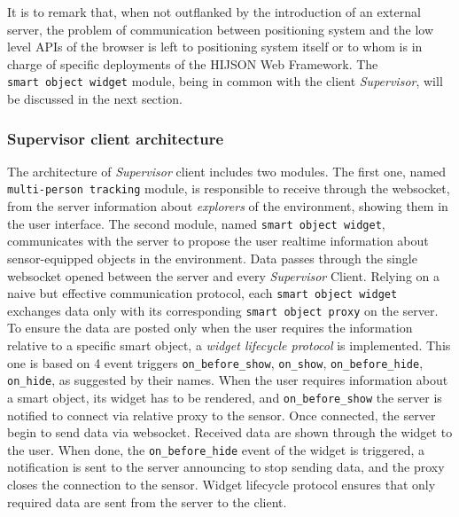 It is to remark that, when not outflanked by the introduction of an external
server, the problem of communication between positioning system and the low
level APIs of the browser is left to positioning system itself or to whom is
in charge of specific deployments of the HIJSON Web Framework.
The \texttt{smart\ object\ widget} module, being in common with the
client \emph{Supervisor}, will be discussed in the next section.

\subsubsection{Supervisor client architecture}\label{supervisor-client-architecture}

The architecture of \emph{Supervisor} client includes two modules. The first
one, named {\tt multi-person\ tracking} module, is responsible to
receive through the websocket, from the server information about
\emph{explorers} of the environment, showing them in the user interface. The
second module, named {\tt smart\ object\ widget}, communicates with the
server to propose the user realtime information about sensor-equip\-ped
objects in the environment. Data passes through the single websocket
opened between the server and every \emph{Supervisor} Client. Relying on a
naive but effective communication protocol, each {\tt smart object widget}
exchanges data only with its corresponding {\tt smart object proxy} on the server. To
ensure the data are posted only when the user requires the information
relative to a specific smart object, a \emph{widget lifecycle protocol} is
implemented. This one is based on 4 event triggers {\tt on\_before\_show},
{\tt on\_show}, {\tt on\_before\_hide}, {\tt on\_hide}, as suggested by their names.
When the user requires information about a smart object, its widget has
to be rendered, and {\tt on\_before\_show} the server is notified to
connect via relative proxy to the sensor. Once connected, the server
begin to send data via websocket. Received data are shown through the
widget to the user. When done, the {\tt on\_before\_hide} event of the
widget is triggered, a notification is sent to the server announcing to stop sending
data, and the proxy closes the connection to the sensor. Widget lifecycle
protocol ensures that only required data are sent from the server to the
client.
